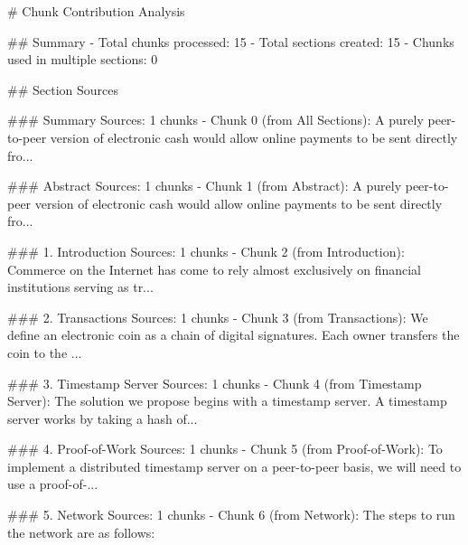 # Chunk Contribution Analysis

## Summary
- Total chunks processed: 15
- Total sections created: 15
- Chunks used in multiple sections: 0

## Section Sources

### Summary
Sources: 1 chunks
- Chunk 0 (from All Sections): A purely peer-to-peer version of electronic cash would allow online payments to be sent directly fro...

### Abstract
Sources: 1 chunks
- Chunk 1 (from Abstract): A purely peer-to-peer version of electronic cash would allow online payments to be sent directly fro...

### 1. Introduction
Sources: 1 chunks
- Chunk 2 (from Introduction): Commerce on the Internet has come to rely almost exclusively on financial institutions serving as tr...

### 2. Transactions
Sources: 1 chunks
- Chunk 3 (from Transactions): We define an electronic coin as a chain of digital signatures. Each owner transfers the coin to the ...

### 3. Timestamp Server
Sources: 1 chunks
- Chunk 4 (from Timestamp Server): The solution we propose begins with a timestamp server. A timestamp server works by taking a hash of...

### 4. Proof-of-Work
Sources: 1 chunks
- Chunk 5 (from Proof-of-Work): To implement a distributed timestamp server on a peer-to-peer basis, we will need to use a proof-of-...

### 5. Network
Sources: 1 chunks
- Chunk 6 (from Network): The steps to run the network are as follows:


